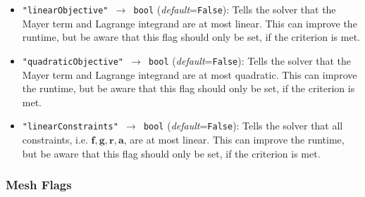 \documentclass[12pt]{article}
\renewcommand{\v}{\bm}
\begin{document}
\begin{mdframed}[backgroundcolor=gray!10, roundcorner=10pt,
		linewidth=1pt]
\begin{itemize}
		\label{flag:linearObjective}
		\item \texttt{"linearObjective" $\rightarrow$ bool}
		(\emph{default}=\texttt{False}): Tells the solver that the Mayer term and Lagrange integrand are at most linear. This can improve the runtime, but be aware that this flag should only be set, if the criterion is met. 
		
		\label{flag:quadraticObjective}
		\item \texttt{"quadraticObjective" $\rightarrow$ bool}
		(\emph{default}=\texttt{False}): Tells the solver that the Mayer term and Lagrange integrand are at most quadratic. This can improve the runtime, but be aware that this flag should only be set, if the criterion is met. 
		
		\label{flag:linearConstraints}
		\item \texttt{"linearConstraints" $\rightarrow$ bool}
		(\emph{default}=\texttt{False}): Tells the solver that all constraints, i.e. $\v{f}, \v{g}, \v{r}, \v{a}$, are at most linear. This can improve the runtime, but be aware that this flag should only be set, if the criterion is met. 

	\end{itemize}
\end{mdframed}


\subsubsection{Mesh Flags}
\label{c:meshflags}
\end{document}
